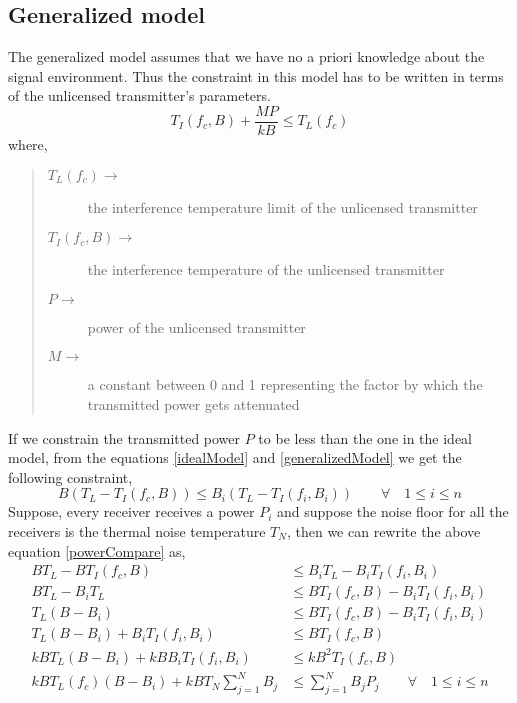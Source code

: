 \documentclass[12pt]{article}
\begin{document}
\subsection{Generalized model}

The generalized model assumes that we have no a priori knowledge about the signal environment. Thus the constraint in this model has to be written in terms of the unlicensed transmitter's parameters.
\begin{equation}
    T_I(f_c,B) + \frac{MP}{kB} \leq T_L(f_c) \label{generalizedModel}
\end{equation}
where,
\begin{quote}
\begin{description}
    \item[$T_L(f_c)\longrightarrow$] the interference temperature limit of the unlicensed transmitter
    \item[$T_I(f_c,B)\longrightarrow$] the interference temperature of the unlicensed transmitter
    \item[$P\longrightarrow$] power of the unlicensed transmitter
    \item[$M\longrightarrow$] a constant between 0 and 1 representing the factor by which the transmitted power gets attenuated
\end{description}
\end{quote}

If we constrain the transmitted power $P$ to be less than the one in the ideal model, from the equations \eqref{idealModel} and \eqref{generalizedModel} we get the following constraint,
\begin{equation}
    B(T_L - T_I(f_c,B)) \leq  B_i(T_L - T_I(f_i,B_i)) \qquad \forall \quad 1 \leq i \leq n \label{powerCompare}
\end{equation}
Suppose, every receiver receives a power $P_i$ and suppose the noise floor for all the receivers is the thermal noise temperature $T_N$, then we can rewrite the above equation \eqref{powerCompare} as,
\begin{align}
    BT_L - BT_I(f_c,B) & \leq  B_iT_L - B_iT_I(f_i,B_i) \nonumber\\  
    BT_L - B_iT_L & \leq BT_I(f_c,B) - B_iT_I(f_i,B_i) \nonumber\\  
    T_L(B- B_i) & \leq BT_I(f_c,B) - B_iT_I(f_i,B_i) \nonumber\\  
    T_L(B - B_i) + B_iT_I(f_i,B_i) & \leq  BT_I(f_c,B) \nonumber\\
    kBT_L(B - B_i) + kBB_iT_I(f_i,B_i) & \leq kB^2T_I(f_c,B) \nonumber\\  
    kBT_L(f_c)(B-B_i) + kBT_N\sum_{j=1}^{N}B_j & \leq \sum_{j=1}^{N}B_jP_j \qquad \forall \quad 1 \leq i\leq n
\end{align}
\end{document}

